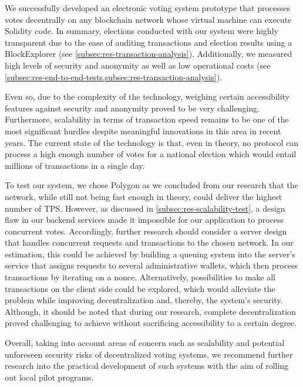 We successfully developed an electronic voting system prototype that processes votes decentrally on any blockchain network whose virtual machine can execute Solidity code.
In summary, elections conducted with our system were highly transparent due to the ease of auditing transactions and election results using a \gls{BlockExplorer} (see \cref{subsec:res-transaction-analysis}).
Additionally, we measured high levels of security and anonymity as well as low operational costs (see \cref{subsec:res-end-to-end-tests,subsec:res-transaction-analysis}).

Even so, due to the complexity of the technology, weighing certain accessibility features against security and anonymity proved to be very challenging.
Furthermore, scalability in terms of transaction speed remains to be one of the most significant hurdles despite meaningful innovations in this area in recent years.
The current state of the technology is that, even in theory, no protocol can process a high enough number of votes for a national election which would entail millions of transactions in a single day.

To test our system, we chose Polygon as we concluded from our research that the network, while still not being fast enough in theory, could deliver the highest number of \gls{TPS}.
However, as discussed in \cref{subsec:res-scalability-test}, a design flaw in our backend services made it impossible for our application to process concurrent votes.
Accordingly, further research should consider a server design that handles concurrent requests and transactions to the chosen network.
In our estimation, this could be achieved by building a queuing system into the server’s service that assigns requests to several administrative wallets, which then process transactions by iterating on a nonce.
Alternatively, possibilities to make all transactions on the client side could be explored, which would alleviate the problem while improving decentralization and, thereby, the system’s security.
Although, it should be noted that during our research, complete decentralization proved challenging to achieve without sacrificing accessibility to a certain degree.

Overall, taking into account areas of concern such as scalability and potential unforeseen security risks of decentralized voting systems, we recommend further research into the practical development of such systems with the aim of rolling out local pilot programs.

